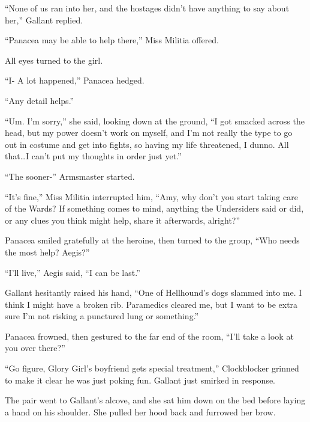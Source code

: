 ``None of us ran into her, and the hostages didn't have anything to say about her,'' Gallant replied.



``Panacea may be able to help there,'' Miss Militia offered.



All eyes turned to the girl.



``I- A lot happened,'' Panacea hedged.



``Any detail helps.''



``Um.  I'm sorry,'' she said, looking down at the ground, ``I got smacked across the head, but my power doesn't work on myself, and I'm not really the type to go out in costume and get into fights, so having my life threatened, I dunno.  All that\ldots I can't put my thoughts in order just yet.''



``The sooner-'' Armsmaster started.



``It's fine,'' Miss Militia interrupted him, ``Amy, why don't you start taking care of the Wards?  If something comes to mind, anything the Undersiders said or did, or any clues you think might help, share it afterwards, alright?''



Panacea smiled gratefully at the heroine, then turned to the group, ``Who needs the most help?  Aegis?''



``I'll live,'' Aegis said, ``I can be last.''



Gallant hesitantly raised his hand, ``One of Hellhound's dogs slammed into me.  I think I might have a broken rib.  Paramedics cleared me, but I want to be extra sure I'm not risking a punctured lung or something.''



Panacea frowned, then gestured to the far end of the room, ``I'll take a look at you over there?''



``Go figure, Glory Girl's boyfriend gets special treatment,'' Clockblocker grinned to make it clear he was just poking fun.  Gallant just smirked in response.



The pair went to Gallant's alcove, and she sat him down on the bed before laying a hand on his shoulder.  She pulled her hood back and furrowed her brow.



